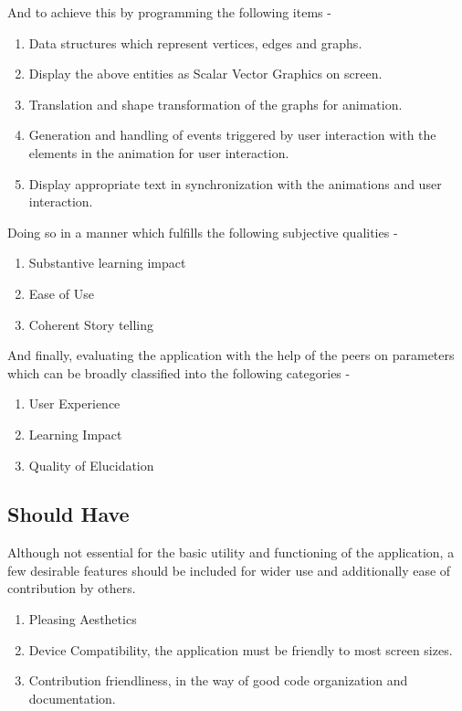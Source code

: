 And to achieve this by programming the following items -

\begin{enumerate}
\item Data structures which represent vertices, edges and graphs.
\item Display the above entities as Scalar Vector Graphics on screen.
\item Translation and shape transformation of the graphs for animation.
\item Generation and handling of events triggered by user interaction with the elements in the animation for user interaction.
\item Display appropriate text in synchronization with the animations and user interaction.
\end{enumerate}

Doing so in a manner which fulfills the following subjective qualities -

\begin{enumerate}
\item Substantive learning impact
\item Ease of Use
\item Coherent Story telling
\end{enumerate}

And finally, evaluating the application with the help of the peers on
parameters which can be broadly classified into the following categories -

\begin{enumerate}
\item User Experience
\item Learning Impact
\item Quality of Elucidation
\end{enumerate}

\subsection{Should Have}
\label{requirements: shouldhave}
Although not essential for the basic utility and functioning of
the application, a few desirable features should be included for wider use and
additionally ease of contribution by others. 
\begin{enumerate}
\item Pleasing Aesthetics
\item Device Compatibility, the application must be friendly to most screen sizes.
\item Contribution friendliness, in the way of good code organization and documentation.
\end{enumerate}


